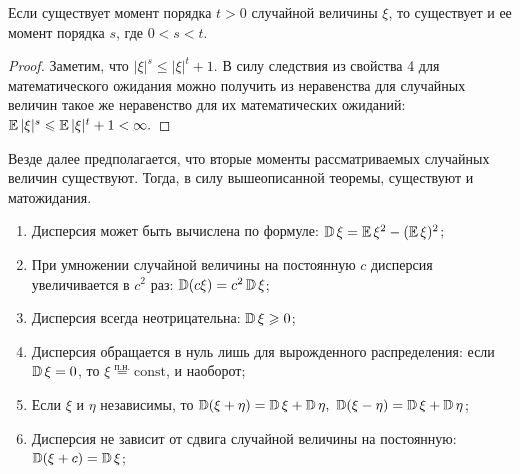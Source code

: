 \begin{thm*}
    Если существует момент порядка $t > 0$ случайной величины $\xi$, то существует и ее момент порядка $s$, где $0 < s < t$.
\end{thm*}

\begin{proof} 
Заметим, что $|\xi|^s \leqslant |\xi|^t + 1.$ 
В силу следствия из свойства 4 для математического ожидания можно получить из неравенства для случайных величин такое же неравенство для их математических ожиданий: $\operatorname{\mathbb{E}} |\xi|^s \leqslant \operatorname{\mathbb{E}} |\xi|^t + 1 < \infty.$
\end{proof}

\begin{namedthm}
    Везде далее предполагается, что вторые моменты рассматриваемых случайных величин существуют. Тогда, в силу вышеописанной теоремы, существуют и матожидания.
    \begin{enumerate}
        \item Дисперсия может быть вычислена по формуле: $\operatorname{\mathbb{D}}\xi = \operatorname{\mathbb{E}} \xi^2 - (\operatorname{\mathbb{E}} \xi)^2$;
        \item При умножении случайной величины на постоянную $c$ дисперсия увеличивается в $c^2$ раз: $\operatorname{\mathbb{D}}(c\xi) = c^2\operatorname{\mathbb{D}}\xi$;
        \item Дисперсия всегда неотрицательна: $\operatorname{\mathbb{D}}\xi \geqslant 0$;
        \item Дисперсия обращается в нуль лишь для вырожденного распределения: если $\operatorname{\mathbb{D}}\xi = 0$, то $\xi \overset{\text{п.н.}}{=} \text{const}$, и наоборот;
        \item Если $\xi$ и $\eta$ независимы, то $\operatorname{\mathbb{D}}(\xi + \eta) = \operatorname{\mathbb{D}}\xi + \operatorname{\mathbb{D}}\eta, ~ \operatorname{\mathbb{D}}(\xi-\eta)=\operatorname{\mathbb{D}} \xi+\operatorname{\mathbb{D}} \eta$;
        \item Дисперсия не зависит от сдвига случайной величины на постоянную: $\operatorname{\mathbb{D}}(\xi + c) = \operatorname{\mathbb{D}}\xi$;
    \end{enumerate}
\end{namedthm}

